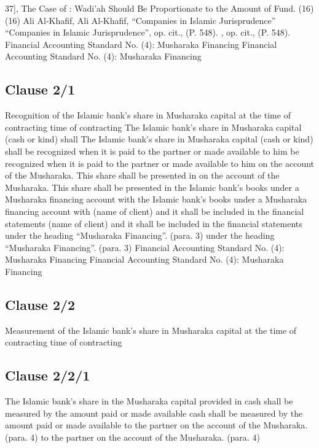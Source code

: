 \documentclass{article}%
\begin{document}
37], The Case of : Wadi’ah Should Be Proportionate to the Amount of Fund.  (16) (16) Ali Al-Khafif,   Ali Al-Khafif, “Companies in Islamic Jurisprudence” “Companies in Islamic Jurisprudence”, op. cit., (P. 548).  , op. cit., (P. 548).  Financial Accounting Standard No. (4): Musharaka Financing Financial Accounting Standard No. (4): Musharaka Financing

%
\subsection{Clause 2/1}%
\label{subsec:Clause2/1}%
Recognition of the Islamic bank’s share in Musharaka capital at the  time of contracting time of contracting   The Islamic bank’s share in Musharaka capital (cash or kind) shall    The Islamic bank’s share in Musharaka capital (cash or kind) shall  be recognized when it is paid to the partner or made available to him  be recognized when it is paid to the partner or made available to him  on the account of the Musharaka. This share shall be presented in  on the account of the Musharaka. This share shall be presented in  the Islamic bank’s books under a Musharaka financing account with  the Islamic bank’s books under a Musharaka financing account with  (name of client) and it shall be included in the financial statements  (name of client) and it shall be included in the financial statements  under the heading “Musharaka Financing”. (para. 3) under the heading “Musharaka Financing”. (para. 3) Financial Accounting Standard No. (4): Musharaka Financing Financial Accounting Standard No. (4): Musharaka Financing

%
\subsection{Clause 2/2}%
\label{subsec:Clause2/2}%
Measurement of the Islamic bank’s share in Musharaka capital at the  time of contracting time of contracting

%
\subsection{Clause 2/2/1}%
\label{subsec:Clause2/2/1}%
The Islamic bank’s share in the Musharaka capital provided in  cash shall be measured by the amount paid or made available  cash shall be measured by the amount paid or made available  to the partner on the account of the Musharaka. (para. 4) to the partner on the account of the Musharaka. (para. 4)

%
\end{document}
